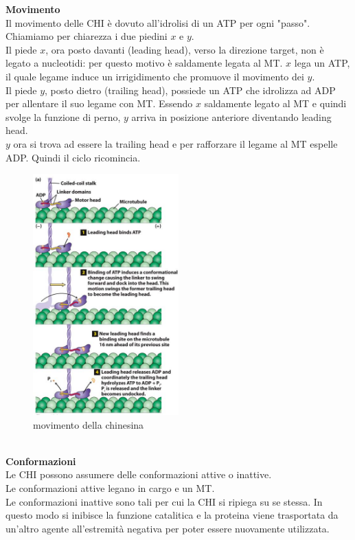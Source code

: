             \textbf{Movimento}\\
                Il movimento delle CHI è dovuto all'idrolisi di un ATP per ogni "passo".
                Chiamiamo per chiarezza i due piedini $x$ e $y$. \\
                Il piede $x$, ora posto davanti (leading head), verso la direzione target, non è legato a nucleotidi: per questo motivo è saldamente legata al MT. $x$ lega un ATP, il quale legame induce un irrigidimento che promuove il movimento dei $y$.\\
                Il piede $y$, posto dietro (trailing head), possiede un ATP che idrolizza ad ADP per allentare il suo legame con MT. Essendo $x$ saldamente legato al MT e quindi svolge la funzione di perno, $y$ arriva in posizione anteriore diventando leading head.\\
                $y$ ora si trova ad essere la trailing head e per rafforzare il legame al MT espelle ADP. Quindi il ciclo ricomincia.
                \begin{figure}[h]
                    \centering
                    \includegraphics[width=0.5\textwidth]{images/chinesinMovement.JPG}
                    \caption{\small movimento della chinesina}
                    \label{fig:mesh1}
                \end{figure}\\
                
            \textbf{Conformazioni}\\
                Le CHI possono assumere delle conformazioni attive o inattive.\\
                Le conformazioni attive legano in cargo e un MT.\\
                Le conformazioni inattive sono tali per cui la CHI si ripiega su se stessa. In questo modo si inibisce la funzione catalitica e la proteina viene trasportata da un'altro agente all'estremità negativa per poter essere nuovamente utilizzata.
            
